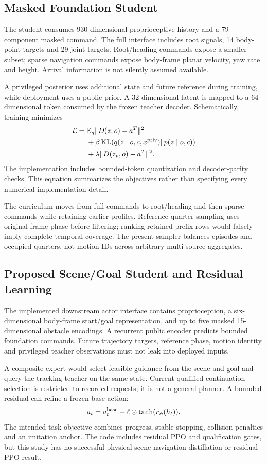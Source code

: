 \documentclass[10pt,twocolumn]{article}
\begin{document}
\subsection{Masked Foundation Student}
The student consumes 930-dimensional proprioceptive history and a 79-component masked command. The full interface includes root signals, 14 body-point targets and 29 joint targets. Root/heading commands expose a smaller subset; sparse navigation commands expose body-frame planar velocity, yaw rate and height. Arrival information is not silently assumed available.

A privileged posterior uses additional state and future reference during training, while deployment uses a public prior. A 32-dimensional latent is mapped to a 64-dimensional token consumed by the frozen teacher decoder. Schematically, training minimizes
\begin{align}
\mathcal L={}&\mathbb E_q\|D(z,o)-a^T\|^2\\
&+\beta\,\mathrm{KL}(q(z\mid o,c,x^{\rm priv})\Vert p(z\mid o,c))\nonumber\\
&+\lambda\|D(\bar z_p,o)-a^T\|^2.\nonumber
\end{align}
The implementation includes bounded-token quantization and decoder-parity checks. This equation summarizes the objectives rather than specifying every numerical implementation detail.

The curriculum moves from full commands to root/heading and then sparse commands while retaining earlier profiles. Reference-quarter sampling uses original frame phase before filtering; ranking retained prefix rows would falsely imply complete temporal coverage. The present sampler balances episodes and occupied quarters, not motion IDs across arbitrary multi-source aggregates.

\subsection{Proposed Scene/Goal Student and Residual Learning}
The implemented downstream actor interface contains proprioception, a six-dimensional body-frame start/goal representation, and up to five masked 15-dimensional obstacle encodings. A recurrent public encoder predicts bounded foundation commands. Future trajectory targets, reference phase, motion identity and privileged teacher observations must not leak into deployed inputs.

A composite expert would select feasible guidance from the scene and goal and query the tracking teacher on the same state. Current qualified-continuation selection is restricted to recorded requests; it is not a general planner. A bounded residual can refine a frozen base action:
\begin{equation}
 a_t= a^{\rm base}_t+\ell\odot\tanh(r_\psi(h_t)).
\end{equation}
The intended task objective combines progress, stable stopping, collision penalties and an imitation anchor. The code includes residual PPO and qualification gates, but this study has no successful physical scene-navigation distillation or residual-PPO result.
\end{document}
